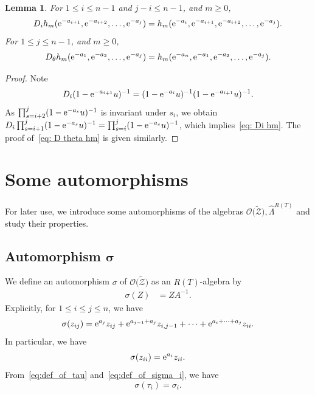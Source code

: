 \documentclass[pdftex]{sigma}
\numberwithin{equation}{section}
\newcommand{\Rep}{{R(T)}}
\newtheorem{Lemma}[Theorem]{Lemma}
\theoremstyle{definition}
\begin{document}
\begin{Lemma}\label{lem:T_on_h}
For
$1\le i\le n-1$ and $j-i\le n-1$, and $m\ge 0$,
\begin{equation}
D_{i}
h_m({\rm e}^{-a_{i+1}},{\rm e}^{-a_{i+2}},\dots,{\rm e}^{-a_j})
=
h_m({\rm e}^{-a_{i}},{\rm e}^{-a_{i+1}},{\rm e}^{-a_{i+2}},\dots,{\rm e}^{-a_j}).
\label{eq: Di hm}
\end{equation}
For $1\le j\le n-1$, and $m\ge 0$,
\begin{equation}
D_{\theta}
h_m({\rm e}^{-a_{1}},{\rm e}^{-a_{2}},\dots,{\rm e}^{-a_j})
=
h_m({\rm e}^{-a_{n}},{\rm e}^{-a_{1}},{\rm e}^{-a_{2}},\dots,{\rm e}^{-a_j}).
\label{eq: D theta hm}
\end{equation}
\end{Lemma}
\begin{proof}
Note
\begin{equation*}
D_i (1-{\rm e}^{-a_{i+1}}u)^{-1}=
(1-{\rm e}^{-a_{i}}u)^{-1}
(1-{\rm e}^{-a_{i+1}}u)^{-1}.
\end{equation*}
As $\prod_{s=i+2}^j(1-{\rm e}^{-a_s}u)^{-1}$ is invariant under $s_i$, we obtain
$D_i\prod_{s=i+1}^j(1-{\rm e}^{-a_s}u)^{-1}=
\prod_{s=i}^j(1-{\rm e}^{-a_s}u)^{-1}$, which implies~\eqref{eq: Di hm}.
The proof of~\eqref{eq: D theta hm} is given similarly.
\end{proof}


\section{Some automorphisms}\label{sec:auto}
For later use, we introduce
some automorphisms of the algebras $\mathscr{O}\bigl(\tilde{\mathscr{Z}}\bigr), \hat{\Lambda}^{\Rep}$
and study their properties.
\subsection[Automorphism sigma]{Automorphism $\boldsymbol{\sigma}$}\label{sec:sigma}

We define an automorphism $\sigma$
of $\mathscr{O}\bigl(\tilde{\mathscr{Z}}\bigr)$ as an $\Rep$-algebra
by
\begin{align}\label{eq:def_of_sigma}
\sigma(Z)&=ZA^{-1}.
\end{align}
Explicitly,
for $1\le i\le j\le n$,
we have
\[
\sigma(z_{ij})={\rm e}^{a_j}z_{ij}+
{\rm e}^{a_{j-1}+a_j}z_{i,j-1}+\cdots+{\rm e}^{a_i+\cdots+a_j}
z_{ii}.
\]
In particular,
we have
\begin{equation}
\label{eq:sigma_zii}
\sigma(z_{ii})={\rm e}^{a_i}z_{ii}.
\end{equation}
From~\eqref{eq:def_of_tau} and~\eqref{eq:def_of_sigma_i}, we have
\begin{equation}\label{eq:sigma_tau_i}
\sigma(\tau_i)=\sigma_i.
\end{equation}
\end{document}
